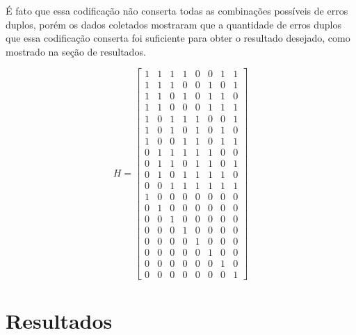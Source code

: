 \documentclass[journal,comsoc]{IEEEtran}
\begin{document}
		É fato que essa codificação não conserta todas as combinações possíveis de erros duplos, porém os dados
		coletados mostraram que a quantidade de erros duplos que essa codificação conserta foi suficiente para obter o resultado desejado, como mostrado na seção de resultados.
		
		\begin{equation}
			H = \begin{bmatrix}
				1 & 1 & 1 & 1 & 0 & 0 & 1 & 1 \\
				1 & 1 & 1 & 0 & 0 & 1 & 0 & 1 \\
				1 & 1 & 0 & 1 & 0 & 1 & 1 & 0 \\
				1 & 1 & 0 & 0 & 0 & 1 & 1 & 1 \\
				1 & 0 & 1 & 1 & 1 & 0 & 0 & 1 \\
				1 & 0 & 1 & 0 & 1 & 0 & 1 & 0 \\
				1 & 0 & 0 & 1 & 1 & 0 & 1 & 1 \\
				0 & 1 & 1 & 1 & 1 & 1 & 0 & 0 \\
				0 & 1 & 1 & 0 & 1 & 1 & 0 & 1 \\
				0 & 1 & 0 & 1 & 1 & 1 & 1 & 0 \\
				0 & 0 & 1 & 1 & 1 & 1 & 1 & 1 \\
				1 & 0 & 0 & 0 & 0 & 0 & 0 & 0 \\
				0 & 1 & 0 & 0 & 0 & 0 & 0 & 0 \\
				0 & 0 & 1 & 0 & 0 & 0 & 0 & 0 \\
				0 & 0 & 0 & 1 & 0 & 0 & 0 & 0 \\
				0 & 0 & 0 & 0 & 1 & 0 & 0 & 0 \\
				0 & 0 & 0 & 0 & 0 & 1 & 0 & 0 \\
				0 & 0 & 0 & 0 & 0 & 0 & 1 & 0 \\
				0 & 0 & 0 & 0 & 0 & 0 & 0 & 1
			\end{bmatrix}
			\label{eq:1911H}
		\end{equation} 
		
	\section{Resultados}
		
\end{document}
